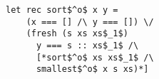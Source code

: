 \begin{figure}[h]
  \centering
  \begin{minipage}{0.65\columnwidth}
    \begin{lstlisting}[frame=tb]
 let rec sort$^o$ x y = 
    (x === [] /\ y === []) \/
    (fresh (s xs xs$_1$)
      y === s :: xs$_1$ /\
      [*sort$^o$ xs xs$_1$ /\
      smallest$^o$ x s xs)*]
    \end{lstlisting}
  \end{minipage}
\end{figure}
